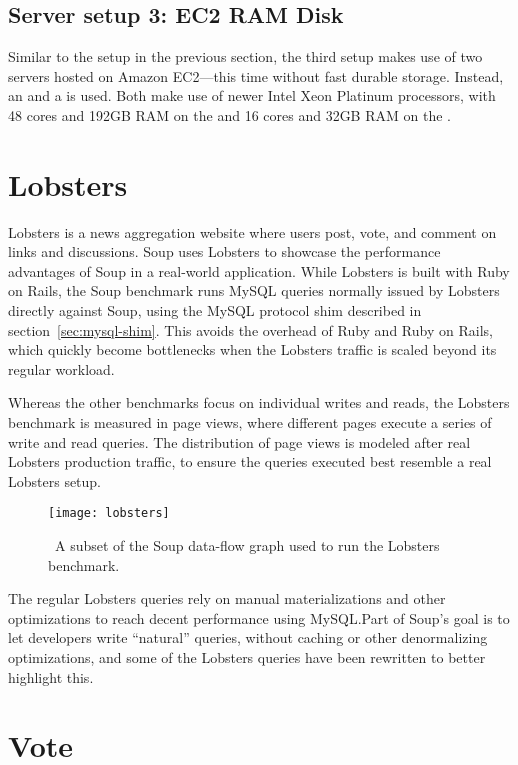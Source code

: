 \subsection{Server setup 3: EC2 RAM Disk}\label{sec:server-3}

Similar to the setup in the previous section, the third setup makes use of two
servers hosted on Amazon EC2---this time without fast durable storage. Instead,
an  and a  is used. Both make use of newer
Intel Xeon Platinum processors, with 48 cores and 192GB RAM on the  and
16 cores and 32GB RAM on the .

\section{Lobsters}\label{sec:lobsters}

Lobsters is a news aggregation website where users post,
vote, and comment on links and discussions. Soup uses Lobsters to showcase the
performance advantages of Soup in a real-world application. While Lobsters is
built with Ruby on Rails, the Soup benchmark runs MySQL queries normally issued
by Lobsters directly against Soup, using the MySQL protocol shim described in
section~\ref{sec:mysql-shim}. This avoids the overhead of Ruby and Ruby on
Rails, which quickly become bottlenecks when the Lobsters traffic is scaled
beyond its regular workload.

Whereas the other benchmarks focus on individual writes and reads, the Lobsters
benchmark is measured in page views, where different pages execute a series of
write and read queries. The distribution of page views is modeled after real
Lobsters production traffic, to ensure the queries executed best resemble a real
Lobsters setup.

\begin{figure}[H]
  \centering
  \texttt{[image: lobsters]}
  \caption{\
    A subset of the Soup data-flow graph used to run the Lobsters benchmark.
  }\label{fig:lobsters-graph}
\end{figure}

The regular Lobsters queries rely on manual materializations and other
optimizations to reach decent performance using MySQL.\@ Part of Soup's goal is
to let developers write ``natural'' queries, without caching or other
denormalizing optimizations, and some of the Lobsters queries have been
rewritten to better highlight this.

\section{Vote}\label{sec:vote}

